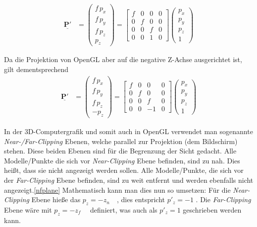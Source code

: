 \begin{align}\mathbf{\underline{P'}} & =
	\begin{pmatrix}f \, p_x \\f \, p_y \\ f \, p_z\\ p_z\end{pmatrix}  = \begin{bmatrix} f & 0 & 0 & 0 \\ 0 & f & 0 & 0 \\ 0 & 0 & f & 0 \\ 0 & 0 & 1 & 0 \end{bmatrix} \begin{pmatrix}p_x \\p_y
		\\ p_z\\ 1 \end{pmatrix} \end{align}

Da die Projektion von OpenGL aber auf die negative Z-Achse ausgerichtet ist, gilt dementsprechend
\begin{align}\mathbf{\underline{P'}} & =
	\begin{pmatrix}f \, p_x \\f \, p_y \\ f \, p_z\\ -p_z\end{pmatrix}  = \begin{bmatrix} f & 0 & 0 & 0 \\ 0 & f & 0 & 0 \\ 0 & 0 & f & 0 \\ 0 & 0 & -1 & 0 \end{bmatrix} \begin{pmatrix}p_x \\p_y
		\\ p_z\\ 1\end{pmatrix} \end{align}

In der 3D-Computergrafik und somit auch in OpenGL verwendet man sogenannte \textit{Near-/Far-Clipping} Ebenen, welche parallel zur Projektion (dem Bildschirm) stehen. Diese beiden Ebenen sind für die Begrenzung der Sicht gedacht. Alle Modelle/Punkte die sich vor \textit{Near-Clipping} Ebene befinden, sind zu nah. Dies heißt, dass sie nicht angezeigt werden sollen. Alle Modelle/Punkte, die sich vor der \textit{Far-Clipping} Ebene befinden, sind zu weit entfernt und werden ebenfalls nicht angezeigt.\cref{nfplane} Mathematisch kann man dies nun so umsetzen: Für die \textit{Near-Clipping} Ebene hieße das $p_z=-z_n \quad$, dies entspricht $p'_z=-1$ . Die \textit{Far-Clipping} Ebene wäre mit $p_z=-z_f \quad$ definiert, was auch als $p'_z=1$ geschrieben werden kann.

